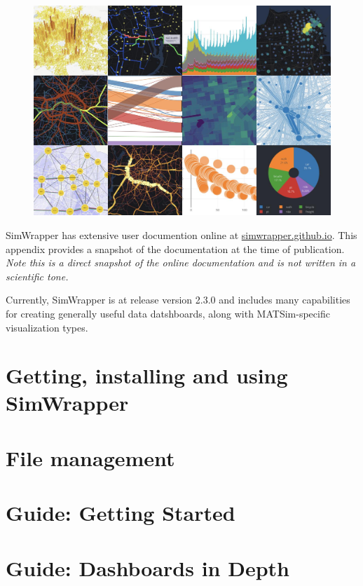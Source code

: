 \begin{figure}[H]
  \centering
  \includegraphics[width=\textwidth]{assets/simwrapper-scrnshot-collage.jpg}
\end{figure}

SimWrapper has extensive user documention online at \url{simwrapper.github.io}. This appendix provides a snapshot of the documentation at the time of publication. \emph{Note this is a direct snapshot of the online documentation and is not written in a scientific tone.}

Currently, SimWrapper is at release version 2.3.0 and includes many capabilities for creating generally useful data datshboards, along with MATSim-specific visualization types.

\section{Getting, installing and using SimWrapper}

\section{File management}


\section{Guide: Getting Started}

\section{Guide: Dashboards in Depth}


